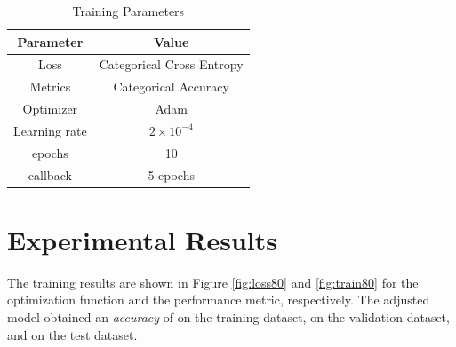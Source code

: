 \documentclass[onecolumn, journal, english, 12pt, a4paper]{IEEEtran} %
\theoremstyle{definition}
\begin{document}
\begin{table}[!t]
\renewcommand{\arraystretch}{1.3}
\caption{Training Parameters}
\label{tab:trainingParam}
\centering
\begin{tabular}{cc}
\hline
Parameter & Value\\
\hline
 Loss & Categorical Cross Entropy\\
Metrics & Categorical Accuracy \\
Optimizer & Adam \\
Learning rate & $2 \times 10^{-4}$ \\
epochs & 10 \\
callback & 5 epochs \\
\hline
\end{tabular}
\end{table}

\section{Experimental Results}\label{chap:resultados}
The training results are shown in Figure \ref{fig:loss80} and
\ref{fig:train80} for the optimization function and the performance
metric, respectively. The adjusted model obtained an \emph{accuracy}
of  on the training dataset,  on the
validation dataset, and  on the test dataset.
\end{document}
